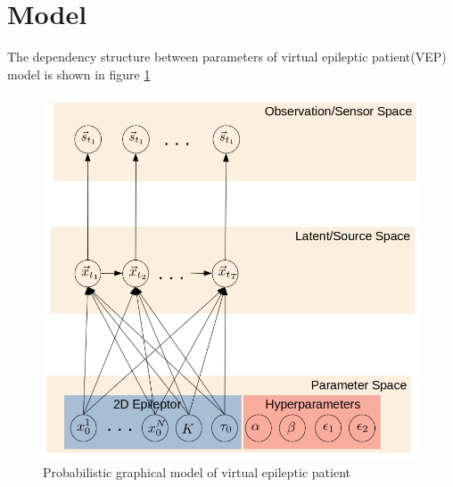 \documentclass[12pt]{article}
\begin{document}
\section*{Model}
The dependency structure between parameters of virtual epileptic patient(VEP) model is shown in figure \ref{fig:vep_model}
\begin{figure}
  \centering
  \includegraphics[width=\textwidth]{figures/vep_model.png}
  \caption{Probabilistic graphical model of virtual epileptic patient}
  \label{fig:vep_model}
\end{figure}
\end{document}
